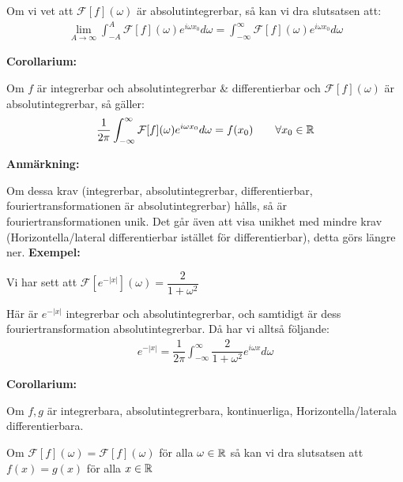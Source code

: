 \par\bigskip
\noindent Om vi vet att $\mathcal{F}[f](\omega)$ är absolutintegrerbar, så kan vi dra slutsatsen att:
\begin{equation*}
  \begin{gathered}
    \lim_{A\to\infty}\int_{-A}^{A}\mathcal{F}[f](\omega)e^{i\omega x_0} d\omega = \int_{-\infty}^{\infty}\mathcal{F}[f](\omega)e^{i\omega x_0}d\omega
  \end{gathered}
\end{equation*}
\par\bigskip
\noindent\textbf{Corollarium:}\par
\noindent Om $f$ är integrerbar och absolutintegrerbar \& differentierbar och $\mathcal{F}[f](\omega)$ är absolutintegrerbar, så gäller:
\begin{equation*}
  \begin{gathered}
    \dfrac{1}{2\pi}\int_{-\infty}^{\infty}\mathcal{F}[f](\omega)e^{i\omega x_0}d\omega = f(x_0)\qquad\forall x_0\in\mathbb{R}
  \end{gathered}
\end{equation*}
\par\bigskip
\noindent\textbf{Anmärkning:}\par
\noindent Om dessa krav (integrerbar, absolutintegrerbar, differentierbar, fouriertransformationen är absolutintegrerbar) hålls, så är fouriertransformationen unik. Det går även att visa unikhet med mindre krav (Horizontella/lateral differentierbar istället för differentierbar), detta görs längre ner.
\newpage
\noindent\textbf{Exempel:}\par
\noindent Vi har sett att $\mathcal{F}[e^{-\left|x\right|}](\omega) = \dfrac{2}{1+\omega^2}$\par
\noindent Här är $e^{-\left|x\right|}$ integrerbar och absolutintegrerbar, och samtidigt är dess fouriertransformation absolutintegrerbar. Då har vi alltså följande:
\begin{equation*}
  \begin{gathered}
    e^{-\left|x\right|} = \dfrac{1}{2\pi}\int_{-\infty}^{\infty}\dfrac{2}{1+\omega^2}e^{i\omega x}d\omega
  \end{gathered}
\end{equation*}
\par\bigskip
\noindent\textbf{Corollarium:}\par
\noindent Om $f,g$ är integrerbara, absolutintegrerbara, kontinuerliga, Horizontella/laterala differentierbara.\par
\noindent Om $\mathcal{F}[f](\omega) = \mathcal{F}[f](\omega)$ för alla $\omega\in\mathbb{R}$ så kan vi dra slutsatsen att $f(x) = g(x)$ för alla $x\in\mathbb{R}$

